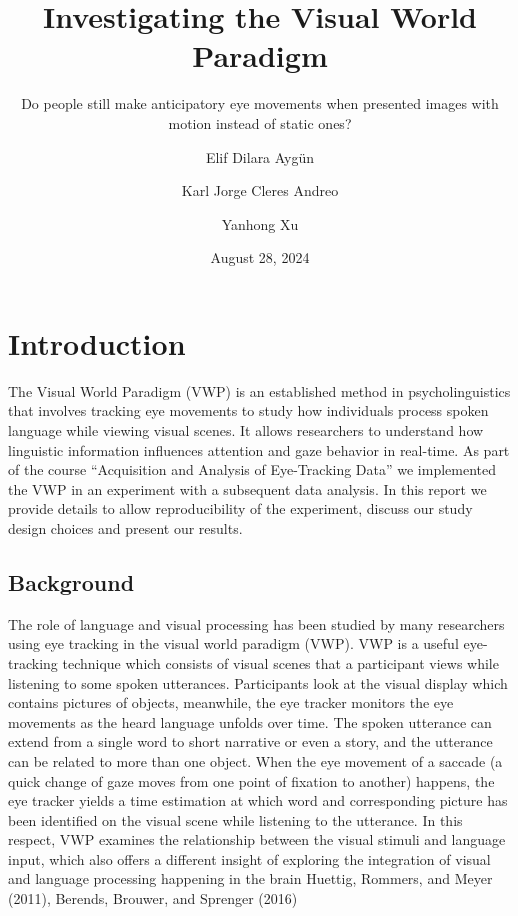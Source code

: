 \documentclass[
  12pt,
  letterpaper,
  DIV=11,
  numbers=noendperiod]{scrreprt}
\title{Investigating the Visual World Paradigm}
\subtitle{Do people still make anticipatory eye movements when presented
images with motion instead of static ones?}
\author{Elif Dilara Aygün \and Karl Jorge Cleres Andreo \and Yanhong Xu}
\date{August 28, 2024}
\renewcommand*\contentsname{Table of contents}
\newcommand\contentsname{Table of contents}
\begin{document}
\maketitle

\renewcommand*\contentsname{Contents}
{
\hypersetup{linkcolor=}
\setcounter{tocdepth}{1}
\tableofcontents
}

\chapter{Introduction}\label{sec-introduction}

The Visual World Paradigm (VWP) is an established method in
psycholinguistics that involves tracking eye movements to study how
individuals process spoken language while viewing visual scenes. It
allows researchers to understand how linguistic information influences
attention and gaze behavior in real-time. As part of the course
``Acquisition and Analysis of Eye-Tracking Data'' we implemented the VWP
in an experiment with a subsequent data analysis. In this report we
provide details to allow reproducibility of the experiment, discuss our
study design choices and present our results.

\section{Background}\label{background}

The role of language and visual processing has been studied by many
researchers using eye tracking in the visual world paradigm (VWP). VWP
is a useful eye-tracking technique which consists of visual scenes that
a participant views while listening to some spoken utterances.
Participants look at the visual display which contains pictures of
objects, meanwhile, the eye tracker monitors the eye movements as the
heard language unfolds over time. The spoken utterance can extend from a
single word to short narrative or even a story, and the utterance can be
related to more than one object. When the eye movement of a saccade (a
quick change of gaze moves from one point of fixation to another)
happens, the eye tracker yields a time estimation at which word and
corresponding picture has been identified on the visual scene while
listening to the utterance. In this respect, VWP examines the
relationship between the visual stimuli and language input, which also
offers a different insight of exploring the integration of visual and
language processing happening in the brain Huettig, Rommers, and Meyer
(2011), Berends, Brouwer, and Sprenger (2016)
\end{document}
